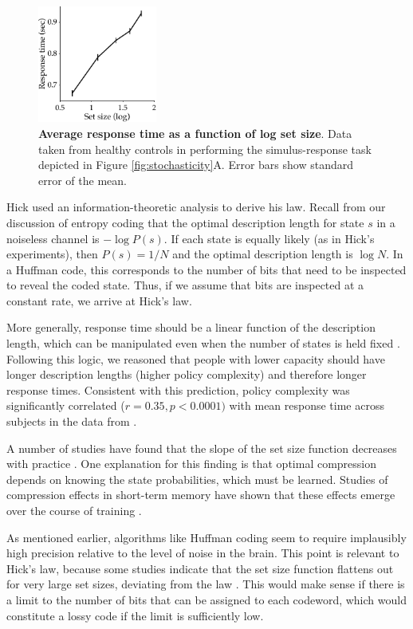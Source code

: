 \documentclass[11pt]{article}
\begin{document}
\begin{figure}
    \centering
    \includegraphics[width=0.35\textwidth]{figs/rt.pdf}
    \caption{\textbf{Average response time as a function of log set size}. Data taken from healthy controls in \citet{collins14} performing the simulus-response task depicted in Figure \ref{fig:stochasticity}A. Error bars show standard error of the mean.}
    \label{fig:RT}
\end{figure}

Hick used an information-theoretic analysis to derive his law. Recall from our discussion of entropy coding that the optimal description length for state $s$ in a noiseless channel is $-\log P(s)$. If each state is equally likely (as in Hick's experiments), then $P(s) = 1/N$ and the optimal description length is $\log N$. In a Huffman code, this corresponds to the number of bits that need to be inspected to reveal the coded state. Thus, if we assume that bits are inspected at a constant rate, we arrive at Hick's law.

More generally, response time should be a linear function of the description length, which can be manipulated even when the number of states is held fixed \citep{hyman53}. Following this logic, we reasoned that people with lower capacity should have longer description lengths (higher policy complexity) and therefore longer response times. Consistent with this prediction, policy complexity was significantly correlated ($r = 0.35, p < 0.0001)$ with mean response time across subjects in the data from \citet{collins18}.

A number of studies have found that the slope of the set size function decreases with practice \citep{hale68,mowbray59,wifall16,teichner74}. One explanation for this finding is that optimal compression depends on knowing the state probabilities, which must be learned. Studies of compression effects in short-term memory have shown that these effects emerge over the course of training \citep{brady09,ngiam19}.

As mentioned earlier, algorithms like Huffman coding seem to require implausibly high precision relative to the level of noise in the brain. This point is relevant to Hick's law, because some studies indicate that the set size function flattens out for very large set sizes, deviating from the law \citep{seibel63,longstreth88}. This would make sense if there is a limit to the number of bits that can be assigned to each codeword, which would constitute a lossy code if the limit is sufficiently low.
\end{document}
